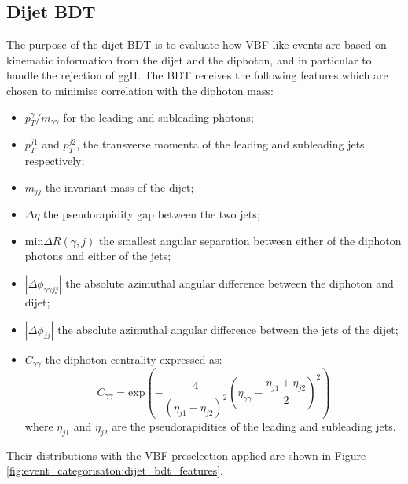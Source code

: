 \subsection{Dijet BDT}
The purpose of the dijet BDT is to evaluate how VBF-like events are based on kinematic information from the dijet and the diphoton, and in particular to handle the rejection of ggH.
The BDT receives the following features which are chosen to minimise correlation with the diphoton mass:
\begin{itemize}[noitemsep]
    \item $p^{\gamma}_{T}/m_{\gamma\gamma}$ for the leading and subleading photons;
    \item $p_{T}^{j1}$ and $p_{T}^{j2}$, the transverse momenta of the leading and subleading jets respectively;
    \item $m_{jj}$ the invariant mass of the dijet;
    \item $\Delta\eta$ the pseudorapidity gap between the two jets;
    \item $\mathrm{min}\Delta{R}(\gamma,j)$ the smallest angular separation between either of the diphoton photons and either of the jets;
    \item $|\Delta\phi_{\gamma\gamma{jj}}|$ the absolute azimuthal angular difference between the diphoton and dijet;
    \item $|\Delta\phi_{jj}|$ the absolute azimuthal angular difference between the jets of the dijet;
    \item $C_{\gamma\gamma}$ the diphoton centrality expressed as:
        \begin{equation}
            C_{\gamma\gamma} = \mathrm{exp}\left(-\frac{4}{(\eta_{j1} - \eta_{j2})^{2}}\left( \eta_{\gamma\gamma} - \frac{\eta_{j1} + \eta_{j2}}{2} \right)^{2}\right)
        \end{equation}
        where $\eta_{j1}$ and $\eta_{j2}$ are the pseudorapidities of the leading and subleading jets.
\end{itemize}
Their distributions with the VBF preselection applied are shown in Figure \ref{fig:event_categorisaton:dijet_bdt_features}.

